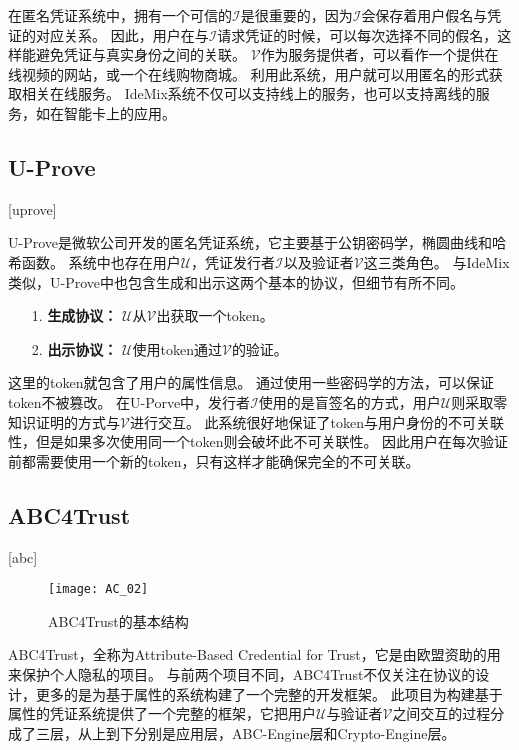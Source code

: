 在匿名凭证系统中，拥有一个可信的$\mathcal{I}$是很重要的，因为$\mathcal{I}$会保存着用户假名与凭证的对应关系。
因此，用户在与$\mathcal{I}$请求凭证的时候，可以每次选择不同的假名，这样能避免凭证与真实身份之间的关联。
$\mathcal{V}$作为服务提供者，可以看作一个提供在线视频的网站，或一个在线购物商城。
利用此系统，用户就可以用匿名的形式获取相关在线服务。
IdeMix系统不仅可以支持线上的服务，也可以支持离线的服务，如在智能卡上的应用\cite{bichsel2009anonymous}。

\subsection{U-Prove}[uprove]

U-Prove是微软公司开发的匿名凭证系统，它主要基于公钥密码学，椭圆曲线和哈希函数。
系统中也存在用户$\mathcal{U}$，凭证发行者$\mathcal{I}$以及验证者$\mathcal{V}$这三类角色。
与IdeMix类似，U-Prove中也包含生成和出示这两个基本的协议，但细节有所不同。

\begin{itemize}
  \item[1.] \textbf{生成协议：} $\mathcal{U}$从$\mathcal{V}$出获取一个token。
  \item[2.] \textbf{出示协议：} $\mathcal{U}$使用token通过$\mathcal{V}$的验证。
\end{itemize}

这里的token就包含了用户的属性信息。
通过使用一些密码学的方法，可以保证token不被篡改。
在U-Porve中，发行者$\mathcal{I}$使用的是盲签名的方式，用户$\mathcal{U}$则采取零知识证明的方式与$\mathcal{V}$进行交互。
此系统很好地保证了token与用户身份的不可关联性，但是如果多次使用同一个token则会破坏此不可关联性。
因此用户在每次验证前都需要使用一个新的token，只有这样才能确保完全的不可关联。

\subsection{ABC4Trust}[abc]

\begin{figure}[h]
\centering
\texttt{[image: AC\_02]}
\caption{ABC4Trust的基本结构}
\end{figure}

ABC4Trust，全称为Attribute-Based Credential for Trust，它是由欧盟资助的用来保护个人隐私的项目\cite{sabouri2012attribute}。
与前两个项目不同，ABC4Trust不仅关注在协议的设计，更多的是为基于属性的系统构建了一个完整的开发框架。
此项目为构建基于属性的凭证系统提供了一个完整的框架，它把用户$\mathcal{U}$与验证者$\mathcal{V}$之间交互的过程分成了三层，从上到下分别是应用层，ABC-Engine层和Crypto-Engine层。

